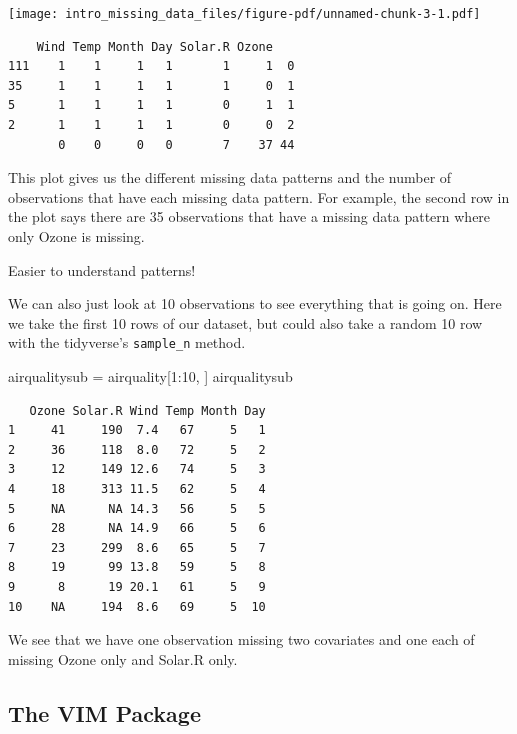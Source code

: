 \documentclass[
  letterpaper,
  DIV=11,
  numbers=noendperiod]{scrreprt}
\newenvironment{Shaded}{}{}
\newcommand{\DecValTok}[1]{\textcolor[rgb]{0.25,0.63,0.44}{#1}}
\newcommand{\NormalTok}[1]{#1}
\newcommand{\OtherTok}[1]{\textcolor[rgb]{0.00,0.44,0.13}{#1}}
\newcommand{\SpecialCharTok}[1]{\textcolor[rgb]{0.25,0.44,0.63}{#1}}
\begin{document}
\begin{center}
\texttt{[image: intro\_missing\_data\_files/figure-pdf/unnamed-chunk-3-1.pdf]}
\end{center}

\begin{verbatim}
    Wind Temp Month Day Solar.R Ozone   
111    1    1     1   1       1     1  0
35     1    1     1   1       1     0  1
5      1    1     1   1       0     1  1
2      1    1     1   1       0     0  2
       0    0     0   0       7    37 44
\end{verbatim}

This plot gives us the different missing data patterns and the number of
observations that have each missing data pattern. For example, the
second row in the plot says there are 35 observations that have a
missing data pattern where only Ozone is missing.

Easier to understand patterns!

We can also just look at 10 observations to see everything that is going
on. Here we take the first 10 rows of our dataset, but could also take a
random 10 row with the tidyverse's \texttt{sample\_n} method.

\begin{Shaded}
\begin{Highlighting}[]
\NormalTok{  airqualitysub }\OtherTok{=}\NormalTok{ airquality[}\DecValTok{1}\SpecialCharTok{:}\DecValTok{10}\NormalTok{, ]}
\NormalTok{  airqualitysub}
\end{Highlighting}
\end{Shaded}

\begin{verbatim}
   Ozone Solar.R Wind Temp Month Day
1     41     190  7.4   67     5   1
2     36     118  8.0   72     5   2
3     12     149 12.6   74     5   3
4     18     313 11.5   62     5   4
5     NA      NA 14.3   56     5   5
6     28      NA 14.9   66     5   6
7     23     299  8.6   65     5   7
8     19      99 13.8   59     5   8
9      8      19 20.1   61     5   9
10    NA     194  8.6   69     5  10
\end{verbatim}

We see that we have one observation missing two covariates and one each
of missing Ozone only and Solar.R only.

\subsection{The VIM Package}\label{the-vim-package}
\end{document}
